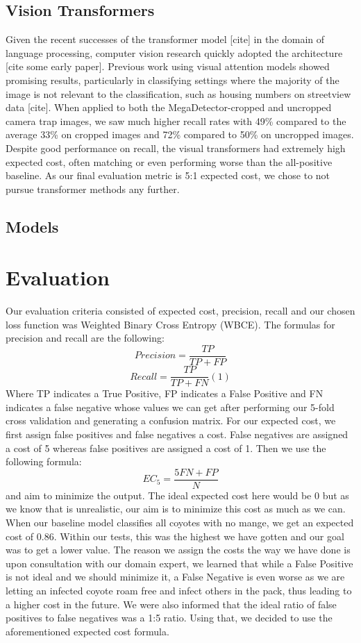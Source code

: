 \documentclass{article}
\begin{document}
\subsection{Vision Transformers}
Given the recent successes of the transformer model [cite] in the domain of language processing, computer vision research quickly adopted the architecture [cite some early paper].  Previous work using visual attention models showed promising results, particularly in classifying settings where the majority of the image is not relevant to the classification, such as housing numbers on streetview data [cite]. When applied to both the MegaDetector-cropped and uncropped camera trap images, we saw much higher recall rates with 49\% compared to the average 33\% on cropped images and 72\% compared to 50\% on uncropped images. Despite good performance on recall, the visual transformers had extremely high expected cost, often matching or even performing worse than the all-positive baseline. As our final evaluation metric is 5:1 expected cost, we chose to not pursue transformer methods any further.

\subsection{Models}

\section{Evaluation}
Our evaluation criteria consisted of expected cost, precision, recall and our chosen loss function was Weighted Binary Cross Entropy (WBCE). The formulas for precision and recall are the following:
\[Precision = \frac{TP}{TP+FP}\]
\[Recall = \frac{TP}{TP+FN}	    (1)\]     %
Where TP indicates a True Positive, FP indicates a False Positive and FN indicates a false negative whose values we can get after performing our 5-fold cross validation and generating a confusion matrix. For our expected cost, we first assign false positives and false negatives a cost. False negatives are assigned a cost of 5 whereas false positives are assigned a cost of 1. Then we use the following formula: 
\[EC_5 = \frac{5FN + FP}{N}\]
and aim to minimize the output. The ideal expected cost here would be 0 but as we know that is unrealistic, our aim is to minimize this cost as much as we can. When our baseline model classifies all coyotes with no mange, we get an expected cost of 0.86. Within our tests, this was the highest we have gotten and our goal was to get a lower value.  The reason we assign the costs the way we have done is upon consultation with our domain expert, we learned that while a False Positive is not ideal and we should minimize it, a False Negative is even worse as we are letting an infected coyote roam free and infect others in the pack, thus leading to a higher cost in the future. We were also informed that the ideal ratio of false positives to false negatives was a 1:5 ratio. Using that, we decided to use the aforementioned expected cost formula.
\end{document}
